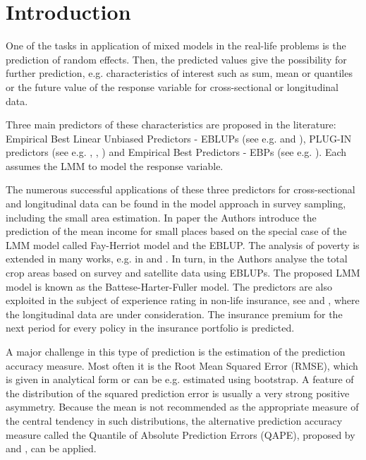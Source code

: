\section{Introduction}
\label{intro}
One of the tasks in application of mixed models in the real-life problems is the prediction of random effects. Then, the predicted values give the possibility for further prediction, e.g.  characteristics of interest such as sum, mean or quantiles or the future value of the response variable for cross-sectional or  longitudinal data.

Three main predictors of these characteristics are proposed in the literature: Empirical Best Linear Unbiased Predictors - EBLUPs (see e.g. \cite{henderson1950estimation} and \cite{royall1976linear}), PLUG-IN predictors (see e.g. \cite{boubeta2016empirical}, \cite{chwila2019properties}, \cite{hobza2016empirical}) and Empirical Best Predictors - EBPs (see e.g. \cite{molina2010small}).  Each assumes the LMM to model the response  variable.

The numerous successful applications of these three predictors for cross-sectional and longitudinal data can be found in the model approach in survey sampling, including the small area estimation. In paper \cite{fay1979estimates} the Authors introduce the prediction of the mean income for small places based on the special case of the LMM model called Fay-Herriot model and the EBLUP. The analysis of poverty is extended in many works, e.g. in \cite{molina2010small} and \cite{christiaensen2012}. In turn, in \cite{SAE1988} the Authors analyse the total crop areas based on survey and satellite data using EBLUPs. The proposed LMM model is known as the Battese-Harter-Fuller model. The predictors are also exploited in the subject of experience rating in non-life insurance, see \cite{frees1999} and \cite{buhlmann2005}, where the longitudinal data are under consideration.  The insurance premium for the next period for every policy in the insurance portfolio is predicted.

A major challenge in this type of prediction is the estimation of the prediction accuracy measure.  Most often it is the Root Mean Squared Error (RMSE), which is given in analytical form or can be e.g. estimated using bootstrap. A feature of the distribution of the squared prediction error is usually a very strong positive asymmetry. Because the mean is not recommended as the appropriate measure of the central tendency in such distributions, the alternative prediction accuracy measure called the Quantile of Absolute Prediction Errors (QAPE), proposed by \cite{zadlo2013parametric} and \cite{zadlo2020bootstrap}, can be applied.

